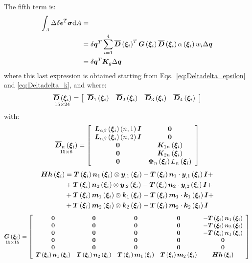 The fifth term is:
\begin{equation}
\begin{split}
\int_A \Delta \delta { \T{\epsilon} }^T \T{\sigma} \text{d}A & = \\
& = \delta{\T{q}}^T  \sum_{i=1}^{4} \overline{\TT{D}}\valxii^T  \TT{G}\valxii  \overline{\TT{D}}\valxii  \alpha \valxii  w_i \Delta \T{q} \\
& = \delta{\T{q}}^T  \TT{K}_g  \Delta \T{q}
\end{split}
\end{equation}
where this last expression is obtained starting from Eqs.~\ref{eq:Deltadelta_epsilon} and \ref{eq:Deltadelta_k}, and where:
\begin{equation}
\underset{ 15 \times 24 }{\overline{\TT{D}} \valxii} =
\sqbr{ \matr{ c c c c  }{
\overline{\TT{D}}_1 \valxii & \overline{\TT{D}}_2 \valxii & \overline{\TT{D}}_3 \valxii & \overline{\TT{D}}_4 \valxii
}}
\end{equation}
with:
\begin{equation}
\underset{ 15 \times 6 }{\overline{\TT{D}}_n \valxii} =
\sqbr{ \matr{ c c  }{
\TT{L}_{\alpha \beta} \valxii \plbr{n,1} \T{I} & \T{0} \\
\TT{L}_{\alpha \beta} \valxii \plbr{n,2} \T{I} & \T{0} \\
\T{0} & \TT{K}_{1n} \valxii\\
\T{0} & \TT{K}_{2n} \valxii \\
\T{0} & \TT{\Phi}_{n} \valxii L_{n} \valxii \\
}}
\end{equation}
\begin{equation}
\begin{split}
\TT{Hh} \valxii & =
\TT{T} \valxii \T{n}_1 \valxii \otimes \T{y}_{,1} \valxii - \TT{T} \valxii \T{n}_1 \cdot \T{y}_{,1} \valxii \T{I} + \\
& + \TT{T} \valxii \T{n}_2 \valxii \otimes \T{y}_{,2} \valxii - \TT{T} \valxii \T{n}_2 \cdot \T{y}_{,2} \valxii \T{I} + \\
& + \TT{T} \valxii \T{m}_1 \valxii \otimes \T{k}_{1} \valxii - \TT{T} \valxii \T{m}_1 \cdot \T{k}_{1} \valxii \T{I} + \\
& + \TT{T} \valxii \T{m}_2 \valxii \otimes \T{k}_{2} \valxii - \TT{T} \valxii \T{m}_2 \cdot \T{k}_{2} \valxii \T{I}
\end{split}
\end{equation}
\begin{equation}
\underset{ 15 \times 15 }{ \TT{G} \valxii } =
\sqbr{ \matr{ c c c c c}{
\T{0} & \T{0} & \T{0} & \T{0} & -\TT{T} \valxii \T{n}_1 \valxii \\
\T{0} & \T{0} & \T{0} & \T{0} & -\TT{T} \valxii \T{n}_2 \valxii \\
\T{0} & \T{0} & \T{0} & \T{0} & -\TT{T} \valxii \T{n}_1 \valxii \\
\T{0} & \T{0} & \T{0} & \T{0} &  \T{0} \\
\T{0} & \T{0} & \T{0} & \T{0} &  \T{0} \\
\TT{T} \valxii \T{n}_1 \valxii & \TT{T} \valxii \T{n}_2 \valxii & \TT{T} \valxii \T{m}_1 \valxii &  \TT{T} \valxii \T{m}_2 \valxii & \TT{Hh} \valxii
}}
\end{equation}
